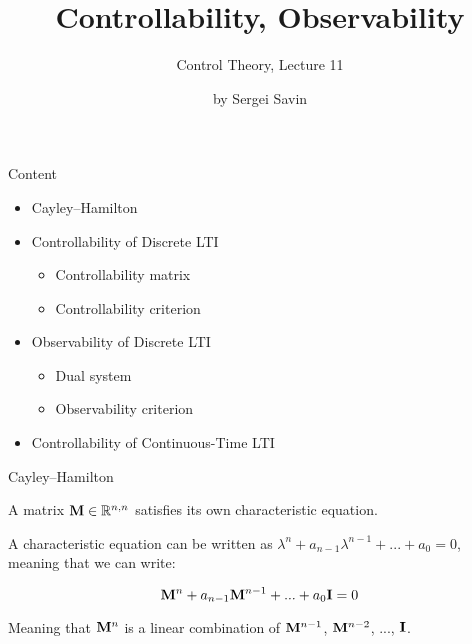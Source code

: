 \documentclass{beamer}
\title{Controllability, Observability}
\subtitle{Control Theory, Lecture 11}
\author{by Sergei Savin}
\date{\mydate}
\begin{document}
\maketitle


\begin{frame}{Content}
\begin{itemize}
\item Cayley–Hamilton
\item Controllability of Discrete LTI
\begin{itemize}
    \item Controllability matrix
    \item Controllability criterion
\end{itemize}
\item Observability of Discrete LTI
\begin{itemize}
    \item Dual system
    \item Observability criterion
\end{itemize}
\item Controllability of Continuous-Time LTI
\end{itemize}
\end{frame}





\begin{frame}{Cayley–Hamilton}
	\begin{flushleft}
		
		\begin{theorem}
			A matrix $\mathbf{M} \in \mathbb{R}^{n, n}$ satisfies its own characteristic equation.
		\end{theorem}
		
		A characteristic equation can be written as $\lambda^n + a_{n-1}\lambda^{n-1} + ... + a_0  = 0$, meaning that we can write:
		
		\begin{equation}
			\mathbf{M}^n + a_{n-1}\mathbf{M}^{n-1} + ... + a_0\mathbf{I}  = 0
		\end{equation}	
		
		Meaning that $\mathbf{M}^n$ is a linear combination of $\mathbf{M}^{n-1}$, $\mathbf{M}^{n-2}$, ..., $\mathbf{I}$.
		
		
	\end{flushleft}
\end{frame}
\end{document}
